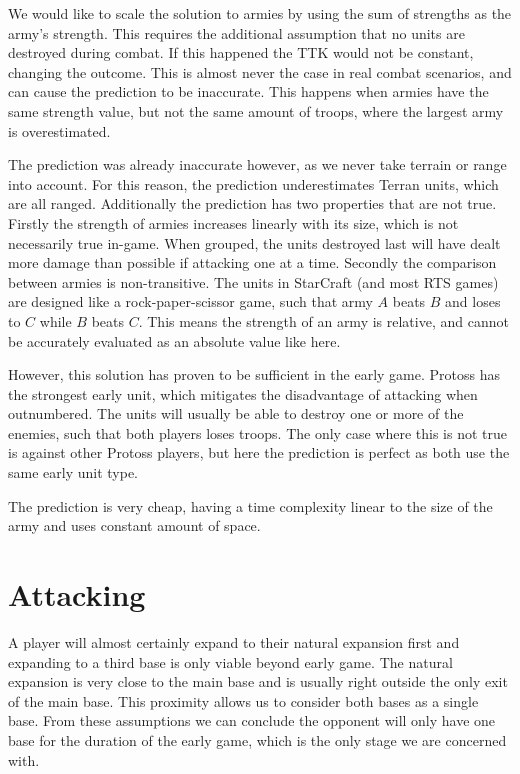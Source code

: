 We would like to scale the solution to armies by using the sum of strengths as the army's strength. This requires the additional assumption that no units are destroyed during combat. If this happened the TTK would not be constant, changing the outcome. This is almost never the case in real combat scenarios, and can cause the prediction to be inaccurate. This happens when armies have the same strength value, but not the same amount of troops, where the largest army is overestimated.

The prediction was already inaccurate however, as we never take terrain or range into account. For this reason, the prediction underestimates Terran units, which are all ranged. Additionally the prediction has two properties that are not true. Firstly the strength of armies increases linearly with its size, which is not necessarily true in-game. When grouped, the units destroyed last will have dealt more damage than possible if attacking one at a time. Secondly the comparison between armies is non-transitive. The units in StarCraft (and most RTS games) are designed like a rock-paper-scissor game, such that army $A$ beats $B$ and loses to $C$ while $B$ beats $C$. This means the strength of an army is relative, and cannot be accurately evaluated as an absolute value like here. 

However, this solution has proven to be sufficient in the early game. Protoss has the strongest early unit, which mitigates the disadvantage of attacking when outnumbered. The units will usually be able to destroy one or more of the enemies, such that both players loses troops. The only case where this is not true is against other Protoss players, but here the prediction is perfect as both use the same early unit type.

The prediction is very cheap, having a time complexity linear to the size of the army and uses constant amount of space.

\section{Attacking}
\label{sec:attacking}
A player will almost certainly expand to their natural expansion first and expanding to a third base is only viable beyond early game. The natural expansion is very close to the main base and is usually right outside the only exit of the main base. This proximity allows us to consider both bases as a single base. From these assumptions we can conclude the opponent will only have one base for the duration of the early game, which is the only stage we are concerned with.

